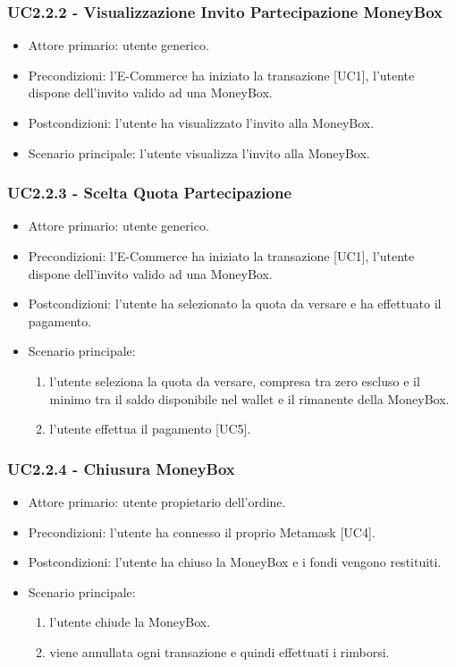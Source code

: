     \subsubsection{UC2.2.2 - Visualizzazione Invito Partecipazione MoneyBox}

    \begin{itemize}
    \item Attore primario: utente generico.
    \item Precondizioni: l'E-Commerce ha iniziato la transazione [UC1], l'utente dispone dell'invito valido ad una MoneyBox.
    \item Postcondizioni: l'utente ha visualizzato l'invito alla MoneyBox.
    \item Scenario principale: l'utente visualizza l'invito alla MoneyBox.
    \end{itemize}

    \subsubsection{UC2.2.3 - Scelta Quota Partecipazione}

    \begin{itemize}
    \item Attore primario: utente generico.
    \item Precondizioni: l'E-Commerce ha iniziato la transazione [UC1], l'utente dispone dell'invito valido ad una MoneyBox.
    \item Postcondizioni: l'utente ha selezionato la quota da versare e ha effettuato il pagamento.
    \item Scenario principale:\begin{enumerate}
        \item l'utente seleziona la quota da versare, compresa tra zero escluso e il minimo tra il saldo disponibile nel wallet e il rimanente della MoneyBox.
        \item l'utente effettua il pagamento [UC5].
    \end{enumerate}
    \end{itemize}

    \subsubsection{UC2.2.4 - Chiusura MoneyBox}

    \begin{itemize}
    \item Attore primario: utente propietario dell'ordine.
    \item Precondizioni: l'utente ha connesso il proprio Metamask [UC4].
    \item Postcondizioni: l'utente ha chiuso la MoneyBox e i fondi vengono restituiti.
    \item Scenario principale: \begin{enumerate}
        \item l'utente chiude la MoneyBox.
        \item viene annullata ogni transazione e quindi effettuati i rimborsi.
    \end{enumerate}
    \end{itemize}

